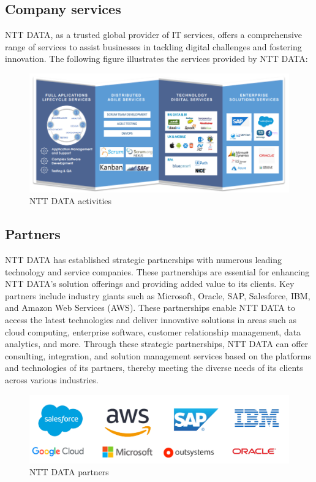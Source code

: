 \pagebreak

\subsection{Company services}

NTT DATA, as a trusted global provider of IT services, offers a comprehensive range of services to assist businesses in tackling digital challenges and fostering innovation. The following figure illustrates the services provided by NTT DATA:
\begin{figure}[h!]
	\centering
	\includegraphics[width=0.8\linewidth]{Image/nttactivities.png}
	\caption{NTT DATA activities}
	\label{fig:NTT DATA activities}
\end{figure}

\subsection{Partners}


NTT DATA has established strategic partnerships with numerous leading technology and service companies. These partnerships are essential for enhancing NTT DATA's solution offerings and providing added value to its clients. Key partners include industry giants such as Microsoft, Oracle, SAP, Salesforce, IBM, and Amazon Web Services (AWS). These partnerships enable NTT DATA to access the latest technologies and deliver innovative solutions in areas such as cloud computing, enterprise software, customer relationship management, data analytics, and more. Through these strategic partnerships, NTT DATA can offer consulting, integration, and solution management services based on the platforms and technologies of its partners, thereby meeting the diverse needs of its clients across various industries.



\begin{figure}[h!]
	\centering
	\includegraphics[width=0.8\linewidth]{Image/nttpartners.png}
	\caption{NTT DATA partners}
	\label{fig:NTT DATA partners}
\end{figure}


